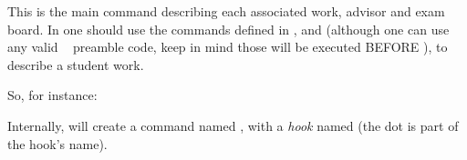 \documentclass[article,nogeometry,english,tocdepth=3,secdepth=3]{ufrgscca} %
\begin{document}
\begin{codedescribe}{\NewStudent}
	\begin{codesyntax}%
	\end{codesyntax}
	This is the main command describing each  associated work, advisor and exam board. In  one should use the commands defined in , and  (although one can use  any valid \LaTeXe~ preamble code, keep in mind those will be executed BEFORE \tsmacro{\begin{document}}{}), to describe a student work.
\end{codedescribe}
	So, for instance:
	\begin{codestore}[st=d.newstudent]
\end{codestore}


\begin{tsremark}[N.B.:]
Internally, \tsmacro{\NewStudent}{} will create a command named \tsmacro{\studentname}{}, with a \emph{hook} named  (the dot is part of the hook's name).
\end{tsremark}
\end{document}
